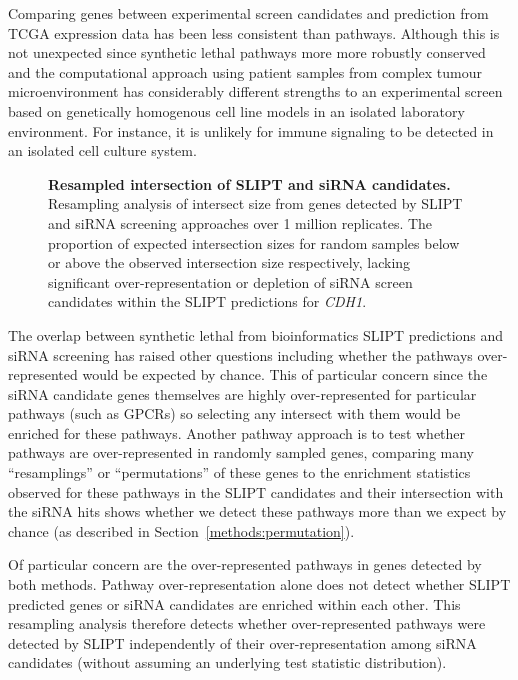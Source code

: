 Comparing genes between experimental screen candidates and prediction from TCGA expression data has been less consistent than pathways. Although this is not unexpected since synthetic lethal pathways more more robustly conserved \citep{Dixon2008} and the computational approach using patient samples from complex tumour microenvironment has considerably different strengths to an experimental screen \citep{Telford2015} based on genetically homogenous cell line models in an isolated laboratory environment. For instance, it is unlikely for immune signaling to be detected in an isolated cell culture system.

\begin{figure}[!ht]
\begin{mdframed}
  \centering
   \caption[Resampled intersection of SLIPT and siRNA candidates]{\small \textbf{Resampled intersection of SLIPT and siRNA candidates.} Resampling analysis of intersect size from genes detected by SLIPT and siRNA screening approaches over 1 million replicates. The proportion of expected intersection sizes for random samples below or above the observed intersection size respectively, lacking significant over-represent\-ation or depletion of siRNA screen candidates within the SLIPT predictions for \textit{CDH1}.
}
\label{fig:perm_sample}
\end{mdframed}
\end{figure}

The overlap between synthetic lethal from bioinformatics SLIPT predictions and siRNA screening has raised other questions including whether the pathways over-represented would be expected by chance. This of particular concern since the siRNA candidate genes themselves are highly over-represented for particular pathways (such as GPCRs) so selecting any intersect with them would be enriched for these pathways. Another pathway approach is to test whether pathways are over-represented in randomly sampled genes, comparing many ``resamplings'' or ``permutations'' of these genes to the enrichment statistics observed for these pathways in the SLIPT candidates and their intersection with the siRNA hits shows whether we detect these pathways more than we expect by chance (as described in Section~\ref{methods:permutation}). 

Of particular concern are the over-represented pathways in genes detected by both methods. Pathway over-representation alone does not detect whether SLIPT predicted genes or siRNA candidates are enriched within each other. This resampling analysis therefore detects whether over-represented pathways were detected by SLIPT independently of their over-representation among siRNA candidates (without assuming an underlying test statistic distribution).

